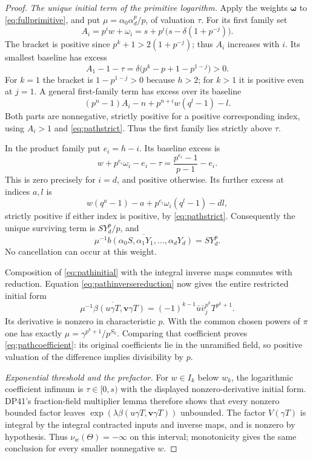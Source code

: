 \documentclass[11pt,a4paper]{article}
\theoremstyle{definition}\newtheorem{remark}[theorem]{Remark}
\begin{document}
\begin{proof}
\emph{The unique initial term of the primitive logarithm.}
Apply the weights $\boldsymbol\omega$ to \eqref{eq:fullprimitive}, and put
$\mu=\alpha_0\alpha_d^p/p$, of valuation $\tau$.
For its first family set
\[
 A_i=p^iw+\omega_i=s+p^i\bigl(s-\delta(1+p^{-j})\bigr).
\]
The bracket is positive since $p^k+1>2(1+p^{-j})$; thus $A_i$ increases with $i$. Its smallest baseline has excess
\[
 A_1-1-\tau
       =\delta\bigl(p^k-p+1-p^{1-j}\bigr)>0.
\]
For $k=1$ the bracket is $1-p^{1-j}>0$ because $h>2$; for $k>1$ it is positive even at $j=1$. A general first-family term has excess over its baseline
\[
 (p^n-1)A_i-n+p^{n+i}w(q^l-1)-l.
\]
Both parts are nonnegative, strictly positive for a positive corresponding index, using $A_i>1$ and \eqref{eq:pathstrict}. Thus the first family lies strictly above $\tau$.

In the product family put $e_i=h-i$. Its baseline excess is
\[
 w+p^{e_i}\omega_i-e_i-\tau
       =\frac{p^{e_i}-1}{p-1}-e_i.
\]
This is zero precisely for $i=d$, and positive otherwise. Its further excess at indices $a,l$ is
\[
 w(q^a-1)-a+p^{e_i}\omega_i(q^l-1)-dl,
\]
strictly positive if either index is positive, by \eqref{eq:pathstrict}. Consequently the unique surviving term is $SY_d^p/p$, and
\begin{equation}\label{eq:pathinitial}
 \overline{\mu^{-1}b(\alpha_0S,\alpha_1Y_1,\ldots,\alpha_dY_d)}
       =SY_d^p.
\end{equation}
No cancellation can occur at this weight.

Composition of \eqref{eq:pathinitial} with the integral inverse maps commutes with reduction. Equation \eqref{eq:pathinversereduction} now gives the entire restricted initial form
\[
 \overline{\mu^{-1}\beta(u\gamma T,\mathbf v\gamma T)}
       =(-1)^{k-1}\bar u\bar v_j^{p^k}T^{p^k+1}.
\]
Its derivative is nonzero in characteristic $p$. With the common chosen powers of $\pi$ one has exactly
$\mu=\gamma^{p^k+1}/p^{S_k}$.
Comparing that coefficient proves \eqref{eq:pathcoefficient}: its original coefficients lie in the unramified field, so positive valuation of the difference implies divisibility by $p$.

\emph{Exponential threshold and the prefactor.}
For $w\in I_k$ below $w_k$, the logarithmic coefficient infimum is
$\tau\in[0,s)$ with the displayed nonzero-derivative initial form.
DP41's fraction-field multiplier lemma therefore shows that every nonzero bounded factor leaves $\exp(\lambda\beta(u\gamma T,\mathbf v\gamma T))$ unbounded.
The factor $V(\gamma T)$ is integral by the integral contracted inputs and inverse maps, and is nonzero by hypothesis. Thus $\nu_w(\Theta)=-\infty$ on this interval; monotonicity gives the same conclusion for every smaller nonnegative $w$.


\end{proof}
\end{document}
